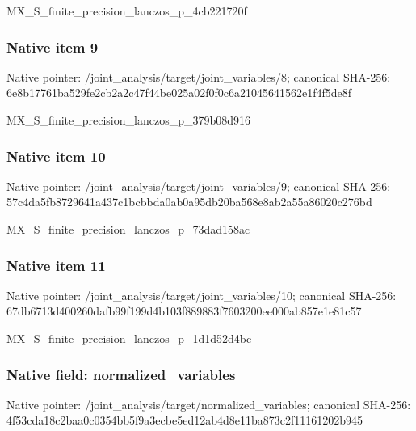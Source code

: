 \documentclass[10pt,a4paper]{article}
\begin{document}
\begingroup\raggedright\sloppy MX\_\allowbreak{}S\_\allowbreak{}finite\_\allowbreak{}precision\_\allowbreak{}lanczos\_\allowbreak{}p\_\allowbreak{}4cb221720f\par\endgroup

\subsubsection{Native item 9}
Native pointer: /joint\_\allowbreak{}analysis/target/joint\_\allowbreak{}variables/8; canonical SHA-256: 6e8b17761ba529fe2cb2a2c47f44be025a02f0f0c6a21045641562e1f4f5de8f

\begingroup\raggedright\sloppy MX\_\allowbreak{}S\_\allowbreak{}finite\_\allowbreak{}precision\_\allowbreak{}lanczos\_\allowbreak{}p\_\allowbreak{}379b08d916\par\endgroup

\subsubsection{Native item 10}
Native pointer: /joint\_\allowbreak{}analysis/target/joint\_\allowbreak{}variables/9; canonical SHA-256: 57c4da5fb8729641a437c1bcbbda0ab0a95db20ba568e8ab2a55a86020c276bd

\begingroup\raggedright\sloppy MX\_\allowbreak{}S\_\allowbreak{}finite\_\allowbreak{}precision\_\allowbreak{}lanczos\_\allowbreak{}p\_\allowbreak{}73dad158ac\par\endgroup

\subsubsection{Native item 11}
Native pointer: /joint\_\allowbreak{}analysis/target/joint\_\allowbreak{}variables/10; canonical SHA-256: 67db6713d400260dafb99f199d4b103f889883f7603200ee000ab857e1e81c57

\begingroup\raggedright\sloppy MX\_\allowbreak{}S\_\allowbreak{}finite\_\allowbreak{}precision\_\allowbreak{}lanczos\_\allowbreak{}p\_\allowbreak{}1d1d52d4bc\par\endgroup

\subsubsection{Native field: normalized\_\allowbreak{}variables}
Native pointer: /joint\_\allowbreak{}analysis/target/normalized\_\allowbreak{}variables; canonical SHA-256: 4f53cda18c2baa0c0354bb5f9a3ecbe5ed12ab4d8e11ba873c2f11161202b945
\end{document}
